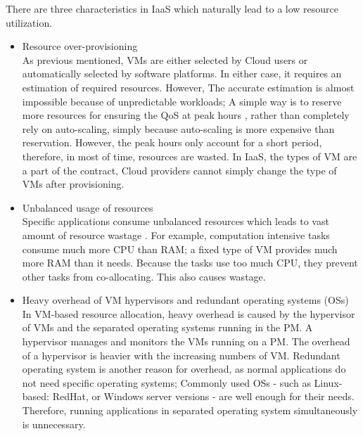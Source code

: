 There are three characteristics in IaaS which naturally lead to a low resource utilization.
\begin{itemize}
	\item Resource over-provisioning \\
	As previous mentioned, VMs are either selected by Cloud users or automatically selected by software platforms. In either case, it requires an estimation of required resources. However, The accurate estimation is almost impossible because of unpredictable workloads; A simple way is to reserve more resources for ensuring the QoS at peak hours \cite{Chaisiri:2012cv}, rather than completely rely on auto-scaling, simply because auto-scaling is more expensive than reservation. However, the peak hours only account for a short period, therefore, in most of time, resources are wasted. In IaaS, the types of VM are a part of the contract, Cloud providers cannot simply change the type of VMs after provisioning.

	\item Unbalanced usage of resources \\
	Specific applications consume unbalanced resources which leads to vast amount of resource wastage \cite{Tomas:2013iv}. For example, computation intensive tasks consume much more CPU than RAM; a fixed type of VM provides much more RAM than it needs. Because the tasks use too much CPU, they prevent other tasks from co-allocating. This also causes wastage.

	\item Heavy overhead of VM hypervisors and redundant operating systems (OSs) \\
	In VM-based resource allocation, heavy overhead is caused by
	the hypervisor of VMs and the separated operating systems running in the PM. A hypervisor manages and monitors the VMs running on a PM. The overhead of a hypervisor is heavier with the increasing numbers of VM. Redundant operating system is another reason for overhead, as normal applications do not need specific operating systems; Commonly used OSs - such as Linux-based: RedHat, or Windows server versions - are well enough for their needs. Therefore, running applications in separated operating system simultaneously is unnecessary.
\end{itemize}


